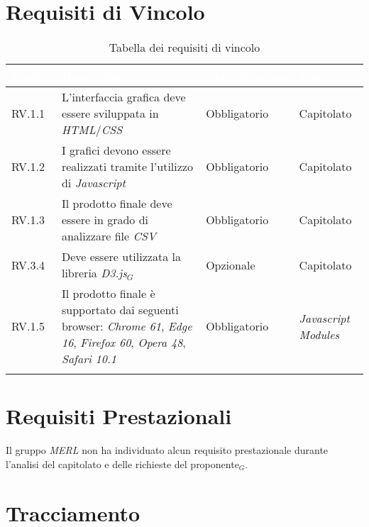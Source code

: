 \section{Requisiti di Vincolo}
\begin{center}
  \centering
  \begin{longtable}{|L{1,5cm}|C{5,5cm}|C{3cm}|C{2cm}|}
    \hline
    \textcolor[HTML]{FFFFFF}{\textbf{Codice}} & \textcolor[HTML]{FFFFFF}{\textbf{Descrizione}} & \textcolor[HTML]{FFFFFF}{\textbf{Classificazione}} & \textcolor[HTML]{FFFFFF}{\textbf{Fonti}}
    \\ \hline
    RV.1.1 & L'interfaccia grafica deve essere sviluppata in \textit{HTML}/\textit{CSS} & Obbligatorio & Capitolato \\ \hline
    RV.1.2 & I grafici devono essere realizzati tramite l'utilizzo di \textit{Javascript} & Obbligatorio & Capitolato \\ \hline
    RV.1.3 & Il prodotto finale deve essere in grado di analizzare file \textit{CSV} & Obbligatorio & Capitolato \\ \hline
    RV.3.4 & Deve essere utilizzata la libreria \textit{D3.js}$_G$ & Opzionale & Capitolato \\ \hline
    RV.1.5 & Il prodotto finale è supportato dai seguenti browser: \textit{Chrome 61}, \textit{Edge 16}, \textit{Firefox 60}, \textit{Opera 48}, \textit{Safari 10.1} & Obbligatorio & \textit{Javascript Modules} \\ \hline


    \caption{Tabella dei requisiti di vincolo}
  \end{longtable}
\end{center}

\section{Requisiti Prestazionali}
Il gruppo \textit{MERL} non ha individuato alcun requisito prestazionale durante l'analisi del capitolato e delle richieste del proponente$_G$.


\section{Tracciamento}


